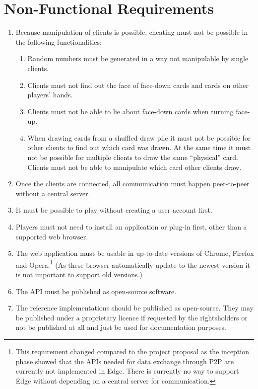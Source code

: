 \section{Non-Functional Requirements}

\begin{enumerate}
  \item Because manipulation of clients is possible, cheating must not be
  possible in the following functionalities:
  \begin{enumerate}
    \item Random numbers must be generated in a way not manipulable by single
    clients.
    \item Clients must not find out the \gls{face} of \gls{face}-down cards and
    cards on other players' \glspl{hand}.
    \item Clients must not be able to lie about \gls{face}-down cards when
    turning \gls{face}-up.
    \item When drawing cards from a shuffled \gls{draw pile} it must not be
    possible for other clients to find out which card was drawn. At the same
    time it must not be possible for multiple clients to draw the same
    ``physical'' card. Clients must not be able to manipulate which card other
    clients draw.
  \end{enumerate}
  \item Once the clients are connected, all communication must happen
  \gls{peer-to-peer} without a central server.
  \item It must be possible to play without creating a user account first.
  \item Players must not need to install an application or plug-in first, other
  than a supported web browser.
  \item The web application must be usable in up-to-date versions of Chrome,
  Firefox and Opera.\footnote{This requirement changed compared to the project
  proposal as the inception phase showed that the APIs needed for data exchange
  through \gls{P2P} are currently not implemented in Edge. There is currently
  no way to support Edge without depending on a central server for
  communication.} (As these browser automatically update to the newest version
  it is not important to support old versions.)
  \item The API must be published as open-source software.
  \item The reference implementations should be published as open-source. They
  may be published under a proprietary licence if requested by the rightsholders
  or not be published at all and just be used for documentation purposes.
\end{enumerate}
